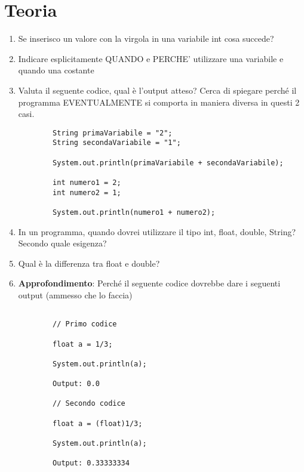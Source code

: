 \documentclass{article}
\begin{document}
\section{Teoria}

\begin{enumerate}

    \item Se inserisco un valore con la virgola in una variabile int cosa succede?
    
    \item Indicare esplicitamente QUANDO e PERCHE' utilizzare una variabile e quando una costante
    
    \item Valuta il seguente codice, qual è l'output atteso? Cerca di spiegare perché il programma EVENTUALMENTE
    si comporta in maniera diversa in questi 2 casi.
    
    \begin{verbatim}
        String primaVariabile = "2";
        String secondaVariabile = "1";

        System.out.println(primaVariabile + secondaVariabile);

        int numero1 = 2;
        int numero2 = 1;

        System.out.println(numero1 + numero2);

    \end{verbatim}

    \item In un programma, quando dovrei utilizzare il tipo int, float, double, String? Secondo quale esigenza?

    \item Qual è la differenza tra float e double?
    
    \item \textbf{Approfondimento}: Perché il seguente codice dovrebbe dare i seguenti output (ammesso che lo faccia)
    
    \begin{verbatim}
        
        // Primo codice

        float a = 1/3;
		
		System.out.println(a);

        Output: 0.0

        // Secondo codice

        float a = (float)1/3;

        System.out.println(a);

        Output: 0.33333334


\end{verbatim}
\end{enumerate}
\end{document}
